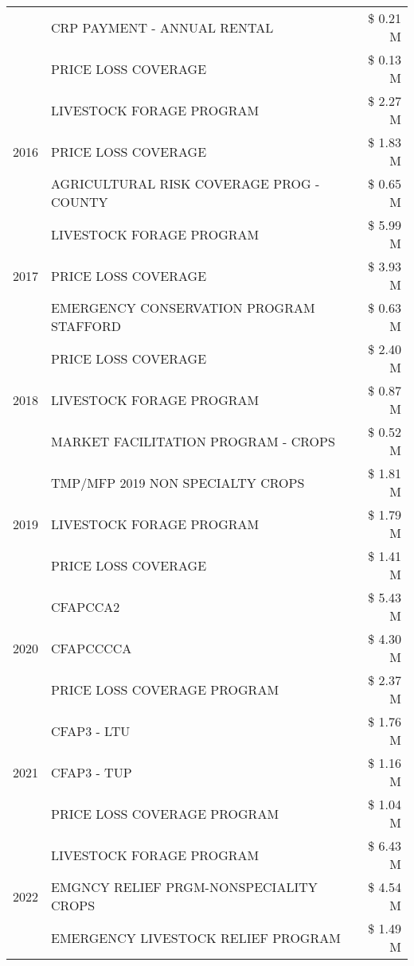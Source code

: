 \begin{tabular}{llr}
 & CRP PAYMENT - ANNUAL RENTAL & \$ 0.21 M \\
 & PRICE LOSS COVERAGE & \$ 0.13 M \\
\cline{1-3}
\multirow[t]{3}{*}{2016} & LIVESTOCK FORAGE PROGRAM & \$ 2.27 M \\
 & PRICE LOSS COVERAGE & \$ 1.83 M \\
 & AGRICULTURAL RISK COVERAGE PROG - COUNTY & \$ 0.65 M \\
\cline{1-3}
\multirow[t]{3}{*}{2017} & LIVESTOCK FORAGE PROGRAM & \$ 5.99 M \\
 & PRICE LOSS COVERAGE & \$ 3.93 M \\
 & EMERGENCY CONSERVATION PROGRAM STAFFORD & \$ 0.63 M \\
\cline{1-3}
\multirow[t]{3}{*}{2018} & PRICE LOSS COVERAGE & \$ 2.40 M \\
 & LIVESTOCK FORAGE PROGRAM & \$ 0.87 M \\
 & MARKET FACILITATION PROGRAM - CROPS & \$ 0.52 M \\
\cline{1-3}
\multirow[t]{3}{*}{2019} & TMP/MFP 2019 NON SPECIALTY CROPS & \$ 1.81 M \\
 & LIVESTOCK FORAGE PROGRAM & \$ 1.79 M \\
 & PRICE LOSS COVERAGE & \$ 1.41 M \\
\cline{1-3}
\multirow[t]{3}{*}{2020} & CFAPCCA2 & \$ 5.43 M \\
 & CFAPCCCCA & \$ 4.30 M \\
 & PRICE LOSS COVERAGE PROGRAM & \$ 2.37 M \\
\cline{1-3}
\multirow[t]{3}{*}{2021} & CFAP3 - LTU & \$ 1.76 M \\
 & CFAP3 - TUP & \$ 1.16 M \\
 & PRICE LOSS COVERAGE PROGRAM & \$ 1.04 M \\
\cline{1-3}
\multirow[t]{3}{*}{2022} & LIVESTOCK FORAGE PROGRAM & \$ 6.43 M \\
 & EMGNCY RELIEF PRGM-NONSPECIALITY CROPS & \$ 4.54 M \\
 & EMERGENCY LIVESTOCK RELIEF PROGRAM & \$ 1.49 M \\
\cline{1-3}
\bottomrule
\end{tabular}
